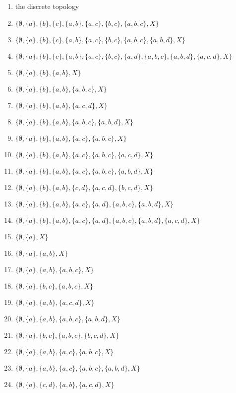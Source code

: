 \begin{enumerate}[1.]
\item the discrete topology
\item $\{\emptyset, \{a\}, \{b\}, \{c\}, \{a,b\}, \{a,c\}, \{b,c\}, \{a,b,c\}, X\}$
\item $\{\emptyset, \{a\}, \{b\}, \{c\}, \{a,b\}, \{a,c\}, \{b,c\}, \{a,b,c\}, \{a,b,d\}, X\}$
\item $\{\emptyset, \{a\}, \{b\}, \{c\}, \{a,b\}, \{a,c\}, \{b,c\}, \{a,d\}, \{a,b,c\}, \{a,b,d\}, \{a,c,d\}, X\}$
\item $\{\emptyset, \{a\}, \{b\}, \{a,b\}, X\}$
\item $\{\emptyset, \{a\}, \{b\}, \{a,b\}, \{a,b,c\}, X\}$
\item $\{\emptyset, \{a\}, \{b\}, \{a,b\}, \{a,c,d\}, X\}$
\item $\{\emptyset, \{a\}, \{b\}, \{a,b\}, \{a,b,c\}, \{a,b,d\}, X\}$
\item $\{\emptyset, \{a\}, \{b\}, \{a,b\}, \{a,c\}, \{a,b,c\}, X\}$
\item $\{\emptyset, \{a\}, \{b\}, \{a,b\}, \{a,c\}, \{a,b,c\}, \{a,c,d\}, X\}$
\item $\{\emptyset, \{a\}, \{b\}, \{a,b\}, \{a,c\}, \{a,b,c\}, \{a,b,d\}, X\}$
\item $\{\emptyset, \{a\}, \{b\}, \{a,b\}, \{c,d\}, \{a,c,d\}, \{b,c,d\}, X\}$
\item $\{\emptyset, \{a\}, \{b\}, \{a,b\}, \{a,c\}, \{a,d\}, \{a,b,c\}, \{a,b,d\}, X\}$
\item $\{\emptyset, \{a\}, \{b\}, \{a,b\}, \{a,c\}, \{a,d\}, \{a,b,c\}, \{a,b,d\}, \{a,c,d\}, X\}$
\item $\{\emptyset, \{a\}, X\}$
\item $\{\emptyset, \{a\}, \{a,b\}, X\}$
\item $\{\emptyset, \{a\}, \{a,b\}, \{a,b,c\}, X\}$
\item $\{\emptyset, \{a\}, \{b,c\}, \{a,b,c\}, X\}$
\item $\{\emptyset, \{a\}, \{a,b\}, \{a,c,d\}, X\}$
\item $\{\emptyset, \{a\}, \{a,b\}, \{a,b,c\}, \{a,b,d\}, X\}$
\item $\{\emptyset, \{a\}, \{b,c\}, \{a,b,c\}, \{b,c,d\}, X\}$
\item $\{\emptyset, \{a\}, \{a,b\}, \{a,c\}, \{a,b,c\}, X\}$
\item $\{\emptyset, \{a\}, \{a,b\}, \{a,c\}, \{a,b,c\}, \{a,b,d\}, X\}$
\item $\{\emptyset, \{a\}, \{c,d\}, \{a,b\}, \{a,c,d\}, X\}$

\end{enumerate}
